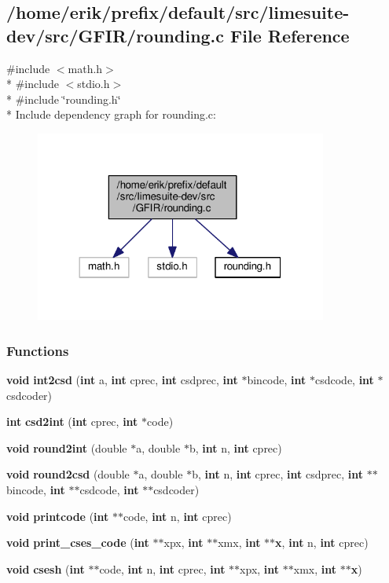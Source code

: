 \subsection{/home/erik/prefix/default/src/limesuite-\/dev/src/\+G\+F\+I\+R/rounding.c File Reference}
\label{rounding_8c}
{\ttfamily \#include $<$math.\+h$>$}\\*
{\ttfamily \#include $<$stdio.\+h$>$}\\*
{\ttfamily \#include \char`\"{}rounding.\+h\char`\"{}}\\*
Include dependency graph for rounding.\+c\+:
\nopagebreak
\begin{figure}[H]
\begin{center}
\leavevmode
\includegraphics[width=272pt]{d4/d31/rounding_8c__incl}
\end{center}
\end{figure}
\subsubsection*{Functions}
\begin{DoxyCompactItemize}
\item 
{\bf void} {\bf int2csd} ({\bf int} a, {\bf int} cprec, {\bf int} csdprec, {\bf int} $\ast$bincode, {\bf int} $\ast$csdcode, {\bf int} $\ast$csdcoder)
\item 
{\bf int} {\bf csd2int} ({\bf int} cprec, {\bf int} $\ast$code)
\item 
{\bf void} {\bf round2int} (double $\ast$a, double $\ast$b, {\bf int} n, {\bf int} cprec)
\item 
{\bf void} {\bf round2csd} (double $\ast$a, double $\ast$b, {\bf int} n, {\bf int} cprec, {\bf int} csdprec, {\bf int} $\ast$$\ast$bincode, {\bf int} $\ast$$\ast$csdcode, {\bf int} $\ast$$\ast$csdcoder)
\item 
{\bf void} {\bf printcode} ({\bf int} $\ast$$\ast$code, {\bf int} n, {\bf int} cprec)
\item 
{\bf void} {\bf print\+\_\+cses\+\_\+code} ({\bf int} $\ast$$\ast$xpx, {\bf int} $\ast$$\ast$xmx, {\bf int} $\ast$$\ast${\bf x}, {\bf int} n, {\bf int} cprec)
\item 
{\bf void} {\bf csesh} ({\bf int} $\ast$$\ast$code, {\bf int} n, {\bf int} cprec, {\bf int} $\ast$$\ast$xpx, {\bf int} $\ast$$\ast$xmx, {\bf int} $\ast$$\ast${\bf x})
\end{DoxyCompactItemize}


